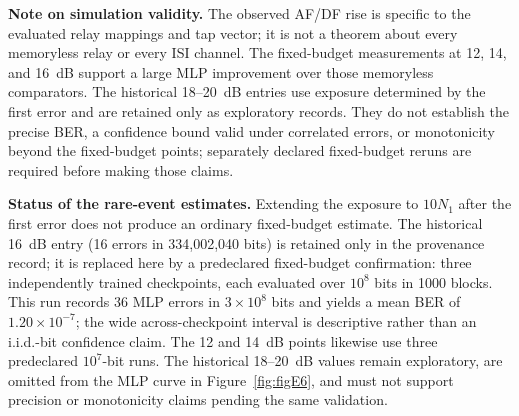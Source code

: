 \textbf{Note on simulation validity.}
The observed AF/DF rise is specific to the evaluated relay mappings and tap vector; it is not a theorem about every memoryless relay or every ISI channel. The fixed-budget measurements at 12, 14, and 16~dB support a large MLP improvement over those memoryless comparators. The historical 18--20~dB entries use exposure determined by the first error and are retained only as exploratory records. They do not establish the precise BER, a confidence bound valid under correlated errors, or monotonicity beyond the fixed-budget points; separately declared fixed-budget reruns are required before making those claims.

\textbf{Status of the rare-event estimates.} Extending the exposure to $10N_1$ after the first error does not produce an ordinary fixed-budget estimate. The historical 16~dB entry (16 errors in 334{,}002{,}040 bits) is retained only in the provenance record; it is replaced here by a predeclared fixed-budget confirmation: three independently trained checkpoints, each evaluated over $10^8$ bits in 1000 blocks. This run records 36 MLP errors in $3\times10^8$ bits and yields a mean BER of $1.20\times10^{-7}$; the wide across-checkpoint interval is descriptive rather than an i.i.d.-bit confidence claim. The 12 and 14~dB points likewise use three predeclared $10^7$-bit runs. The historical 18--20~dB values remain exploratory, are omitted from the MLP curve in Figure~\ref{fig:figE6}, and must not support precision or monotonicity claims pending the same validation.

